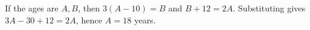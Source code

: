 If the ages are $A,B$, then $3(A-10)=B$ and $B+12=2A$. Substituting gives $3A-30+12=2A$, hence $\boxed{A=18}$ years.
